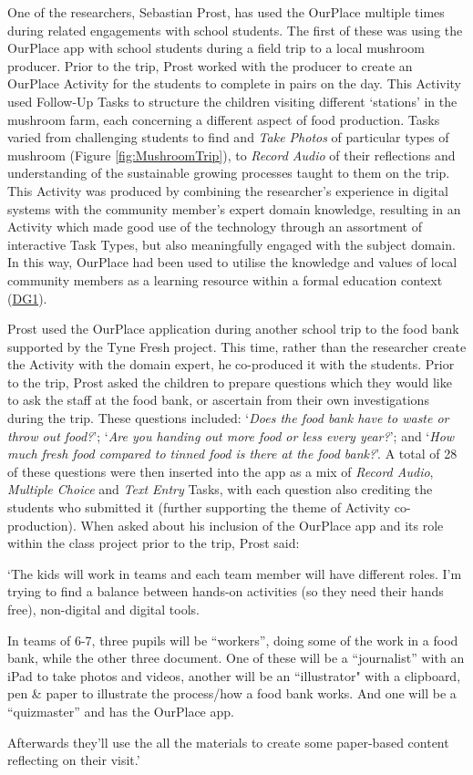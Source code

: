 One of the researchers, Sebastian Prost, has used the OurPlace multiple times during related engagements with school students. The first of these was using the OurPlace app with school students during a field trip to a local mushroom producer. Prior to the trip, Prost worked with the producer to create an OurPlace Activity for the students to complete in pairs on the day. This Activity used Follow-Up Tasks to structure the children visiting different `stations' in the mushroom farm, each concerning a different aspect of food production. Tasks varied from challenging students to find and \textit{Take Photos} of particular types of mushroom (Figure \ref{fig:MushroomTrip}), to \textit{Record Audio} of their reflections and understanding of the sustainable growing processes taught to them on the trip. This Activity was produced by combining the researcher's experience in digital systems with the community member's expert domain knowledge, resulting in an Activity which made good use of the technology through an assortment of interactive Task Types, but also meaningfully engaged with the subject domain. In this way, OurPlace had been used to utilise the knowledge and values of local community members as a learning resource within a formal education context (\hyperref[DG1]{DG1}).

Prost used the OurPlace application during another school trip to the food bank supported by the Tyne Fresh project. This time, rather than the researcher create the Activity with the domain expert, he co-produced it with the students. Prior to the trip, Prost asked the children to prepare questions which they would like to ask the staff at the food bank, or ascertain from their own investigations during the trip. These questions included: `\textit{Does the food bank have to waste or throw out food?}'; `\textit{Are you handing out more food or less every year?}'; and `\textit{How much fresh food compared to tinned food is there at the food bank?}'. A total of 28 of these questions were then inserted into the app as a mix of \textit{Record Audio}, \textit{Multiple Choice} and \textit{Text Entry} Tasks, with each question also crediting the students who submitted it (further supporting the theme of Activity co-production). When asked about his inclusion of the OurPlace app and its role within the class project prior to the trip, Prost said:

\begin{displayquote}
`The kids will work in teams and each team member will have different roles. I’m trying to find a balance between hands-on activities (so they need their hands free), non-digital and digital tools.

In teams of 6-7, three pupils will be “workers”, doing some of the work in a food bank, while the other three document. One of these will be a “journalist” with an iPad to take photos and videos, another will be an “illustrator" with a clipboard, pen \& paper to illustrate the process/how a food bank works. And one will be a “quizmaster” and has the OurPlace app.

Afterwards they’ll use the all the materials to create some paper-based content reflecting on their visit.'
\end{displayquote}

